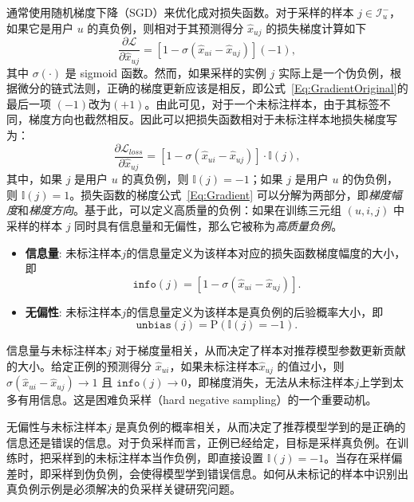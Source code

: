 \par
通常使用随机梯度下降（SGD）来优化成对损失函数。对于采样的样本 $j \in \mathcal{I}_u^-$，如果它是用户 $u$ 的真负例，则相对于其预测得分 $\hat{x}_{uj}$ 的损失梯度计算如下
\begin{equation}\label{Eq:GradientOriginal}
	\frac{\partial \mathcal{L} }{\partial \hat{x}_{uj}} = [1-\sigma(\hat{x}_{ui} - \hat{x}_{uj})] (-1),
\end{equation}
其中 $\sigma(\cdot)$ 是 \textsf{sigmoid} 函数。然而，如果采样的实例 $j$ 实际上是一个伪负例，根据微分的链式法则，正确的梯度更新应该是相反，即公式~\eqref{Eq:GradientOriginal}的最后一项 $(-1)$改为$(+1)$。由此可见，对于一个未标注样本，由于其标签不同，梯度方向也截然相反。因此可以把损失函数相对于未标注样本地损失梯度写为：
\begin{equation}\label{Eq:Gradient}
	\frac{\partial \mathcal{L}_{loss} }{\partial \hat{x}_{uj}} = [1-\sigma(\hat{x}_{ui} - \hat{x}_{uj})] \cdot \mathbb{I}(j),
\end{equation}
其中，如果 $j$ 是用户 $u$ 的真负例，则 $\mathbb{I}(j)=-1$；如果 $j$ 是用户 $u$ 的伪负例，则 $\mathbb{I}(j)=1$。损失函数的梯度公式~\eqref{Eq:Gradient} 可以分解为两部分，即\textit{梯度幅度}和\textit{梯度方向}。基于此，可以定义高质量的负例：如果在训练三元组 $(u,i,j)$ 中采样的样本 $j$ 同时具有信息量和无偏性，那么它被称为\textit{高质量负例}。
\begin{itemize}
	\item \textbf{信息量}: 未标注样本$j$的信息量定义为该样本对应的损失函数梯度幅度的大小，即
	\begin{equation}\label{Eq:Informativeness}
		\mathtt{info}(j) =  [1-\sigma(\hat{x}_{ui} - \hat{x}_{uj})].
	\end{equation}
	\item \textbf{无偏性}: 未标注样本$j$的信息量定义为该样本是真负例的后验概率大小，即
	\begin{equation}\label{Eq:Unbiasedness}
		\mathtt{unbias}(j) = \mathrm{P}(\mathbb{I}(j) = -1).
	\end{equation}
\end{itemize}

信息量与未标注样本$j$ 对于梯度量相关，从而决定了样本对推荐模型参数更新贡献的大小。给定正例的预测得分 $\hat{x}_{ui}$，如果未标注样本$\hat{x}_{uj}$ 的值过小，则 $\sigma(\hat{x}_{ui} - \hat{x}_{uj}) \rightarrow 1$ 且 $\mathtt{info}(j) \rightarrow 0$，即梯度消失，无法从未标注样本$j$上学到太多有用信息。这是困难负采样（hard negative sampling）的一个重要动机。

无偏性与未标注样本$j$ 是真负例的概率相关，从而决定了推荐模型学到的是正确的信息还是错误的信息。对于负采样而言，正例已经给定，目标是采样真负例。在训练时，把采样到的未标注样本当作负例，即直接设置 $\mathbb{I}(j)=-1$。当存在采样偏差时，即采样到伪负例，会使得模型学到错误信息。如何从未标记的样本中识别出真负例示例是必须解决的负采样关键研究问题。

